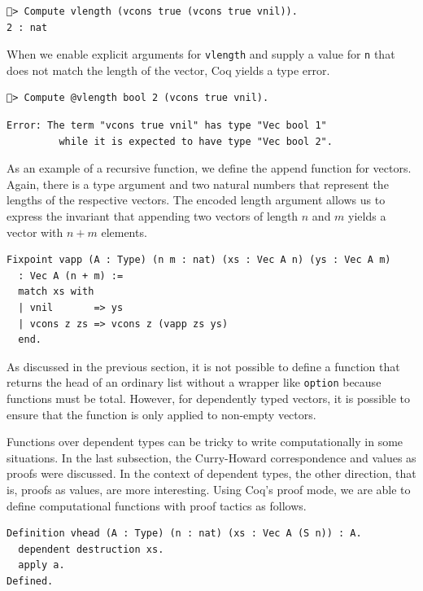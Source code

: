 \documentclass[a4paper, 11pt, fleqn, twoside, abstract=on]{scrreprt}
\newcommand{\cinl}[1]{\texttt{#1}}
\begin{document}
\begin{verbatim}
🐔> Compute vlength (vcons true (vcons true vnil)).
2 : nat
\end{verbatim}

When we enable explicit arguments for \cinl{vlength} and supply a value for \cinl{n} that does not match the length of the vector, Coq yields a type error.

\begin{verbatim}
🐔> Compute @vlength bool 2 (vcons true vnil).
\end{verbatim}
\vspace*{-18pt}
\begin{verbatim}
Error: The term "vcons true vnil" has type "Vec bool 1"
         while it is expected to have type "Vec bool 2".
\end{verbatim}

As an example of a recursive function, we define the append function for vectors.
Again, there is a type argument and two natural numbers that represent the lengths of the respective vectors.
The encoded length argument allows us to express the invariant that appending two vectors of length $n$ and $m$ yields a vector with $n + m$ elements.

\begin{verbatim}
Fixpoint vapp (A : Type) (n m : nat) (xs : Vec A n) (ys : Vec A m) 
  : Vec A (n + m) :=
  match xs with
  | vnil       => ys
  | vcons z zs => vcons z (vapp zs ys)
  end.
\end{verbatim}

As discussed in the previous section, it is not possible to define a function that returns the head of an ordinary list without a wrapper like \cinl{option} because functions must be total.
However, for dependently typed vectors, it is possible to ensure that the function is only applied to non-empty vectors.

Functions over dependent types can be tricky to write computationally in some situations.
In the last subsection, the Curry-Howard correspondence and values as proofs were discussed.
In the context of dependent types, the other direction, that is, proofs as values, are more interesting.
Using Coq's proof mode, we are able to define computational functions with proof tactics as follows.

\begin{verbatim}
Definition vhead (A : Type) (n : nat) (xs : Vec A (S n)) : A.
  dependent destruction xs.
  apply a.
Defined.
\end{verbatim}
\end{document}
